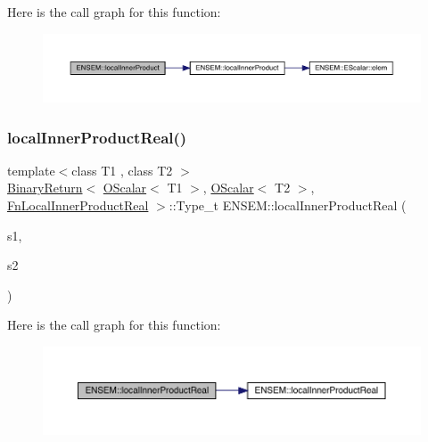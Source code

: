 Here is the call graph for this function\+:\nopagebreak
\begin{figure}[H]
\begin{center}
\leavevmode
\includegraphics[width=350pt]{d1/d71/group__obsscalar_ga17966d3d3b6922670f83bb3f96b1cd76_cgraph}
\end{center}
\end{figure}
\mbox{\label{group__obsscalar_ga83c87e37c0e8b624401c37ff72a5f23c}} 
\subsubsection{\texorpdfstring{localInnerProductReal()}{localInnerProductReal()}}
{\footnotesize\ttfamily template$<$class T1 , class T2 $>$ \\
\mbox{\hyperlink{structENSEM_1_1BinaryReturn}{Binary\+Return}}$<$ \mbox{\hyperlink{classENSEM_1_1OScalar}{O\+Scalar}}$<$ T1 $>$, \mbox{\hyperlink{classENSEM_1_1OScalar}{O\+Scalar}}$<$ T2 $>$, \mbox{\hyperlink{structENSEM_1_1FnLocalInnerProductReal}{Fn\+Local\+Inner\+Product\+Real}} $>$\+::Type\+\_\+t E\+N\+S\+E\+M\+::local\+Inner\+Product\+Real (\begin{DoxyParamCaption}\item[{const \mbox{\hyperlink{classENSEM_1_1OScalar}{O\+Scalar}}$<$ T1 $>$ \&}]{s1,  }\item[{const \mbox{\hyperlink{classENSEM_1_1OScalar}{O\+Scalar}}$<$ T2 $>$ \&}]{s2 }\end{DoxyParamCaption})\hspace{0.3cm}{\ttfamily [inline]}}

Here is the call graph for this function\+:\nopagebreak
\begin{figure}[H]
\begin{center}
\leavevmode
\includegraphics[width=350pt]{d1/d71/group__obsscalar_ga83c87e37c0e8b624401c37ff72a5f23c_cgraph}
\end{center}
\end{figure}
\mbox{\label{group__obsscalar_ga2bc0a069388839d76a68f281dce936a6}} 
